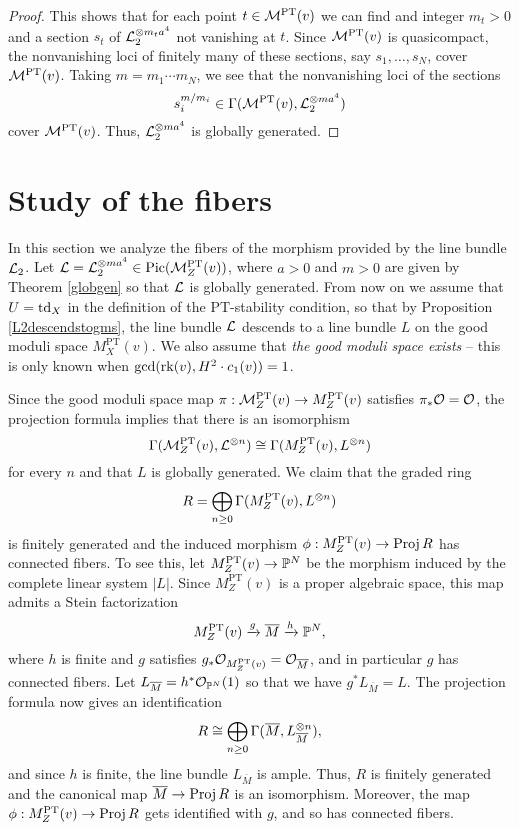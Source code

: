 \begin{proof}
    This shows that for each point $t \in \mathcal{M}^{\mathrm{PT}}(v)$ we can find and integer $m_t > 0$ and a section $s_t$ of $\mathcal{L}_2^{\otimes m_t a^4}$ not vanishing at $t$. Since $\mathcal{M}^{\mathrm{PT}}(v)$ is quasicompact, the nonvanishing loci of finitely many of these sections, say $s_1,\ldots, s_N$, cover $\mathcal{M}^{\mathrm{PT}}(v)$. Taking $m = m_1 \cdots m_N$, we see that the nonvanishing loci of the sections
    \[ s_i^{m/m_i} \in \Gamma(\mathcal{M}^{\mathrm{PT}}(v), \mathcal{L}_2^{\otimes m a^4}) \]
    cover $\mathcal{M}^{\mathrm{PT}}(v)$. Thus, $\mathcal{L}_2^{\otimes m a^4}$ is globally generated.
\end{proof}



\section{Study of the fibers}\label{section:studyoffibers}
In this section we analyze the fibers of the morphism provided by the line bundle $\mathcal{L}_2$. Let $\mathcal{L} = \mathcal{L}_2^{\otimes m a^4} \in \mathrm{Pic}(\mathcal{M}^{\text{PT}}_Z(v))$, where $a > 0$ and $m > 0$ are given by Theorem \ref{globgen} so that $\mathcal{L}$ is globally generated. From now on we assume that $U = \operatorname{\mathrm{td}}_X$ in the definition of the PT-stability condition, so that by Proposition \ref{L2descendstogms}, the line bundle $\mathcal{L}$ descends to a line bundle $L$ on the good moduli space $M^{\text{PT}}_X(v)$. We also assume that \textit{the good moduli space exists} -- this is only known when $\gcd(\operatorname{\mathrm{rk}}(v), H^2 \cdot c_1(v)) = 1$. 

Since the good moduli space map $\pi: \mathcal{M}^{\text{PT}}_Z(v) \to M^{\text{PT}}_Z(v)$ satisfies $\pi_*\mathcal{O} = \mathcal{O}$, the projection formula implies that there is an isomorphism
\[ \Gamma(\mathcal{M}^{\text{PT}}_Z(v), \mathcal{L}^{\otimes n}) \cong \Gamma(M^{\text{PT}}_Z(v), L^{\otimes n}) \]
for every $n$ and that $L$ is globally generated. We claim that the graded ring
\[ R = \bigoplus_{n\ge 0} \Gamma(M^{\text{PT}}_Z(v), L^{\otimes n}) \]
is finitely generated and the induced morphism $\phi: M^{\text{PT}}_Z(v) \to \operatorname{\mathrm{Proj}} R$ has connected fibers. To see this, let $M^{\text{PT}}_Z(v) \to \mathbb{P}^N$ be the morphism induced by the complete linear system $|L|$. Since $M^{\text{PT}}_Z(v)$ is a proper algebraic space, this map admits a Stein factorization
\[ M^{\text{PT}}_Z(v) \xrightarrow{g} \overline{M} \xrightarrow{h} \mathbb{P}^N, \]
where $h$ is finite and $g$ satisfies $g_*\mathcal{O}_{M^{\text{PT}}_Z(v)} = \mathcal{O}_{\overline{M}}$, and in particular $g$ has connected fibers. Let $L_{\overline{M}} = h^*\mathcal{O}_{\mathbb{P}^N}(1)$ so that we have $g^*L_{\overline{M}} = L$. The projection formula now gives an identification
\[ R \cong \bigoplus_{n\ge 0} \Gamma(\overline{M}, L_{\overline{M}}^{\otimes n}), \]
and since $h$ is finite, the line bundle $L_{\overline{M}}$ is ample. Thus, $R$ is finitely generated and the canonical map $\overline{M} \to \operatorname{\mathrm{Proj}} R$ is an isomorphism. Moreover, the map $\phi: M^{\text{PT}}_Z(v) \to \operatorname{\mathrm{Proj}} R$ gets identified with $g$, and so has connected fibers. 

